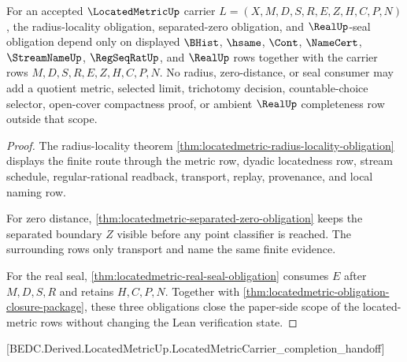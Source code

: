 \begin{theorem}\label{thm:locatedmetric-scoped-obligation-rows}
For an accepted $\LocatedMetricUp$ carrier $L=(X,M,D,S,R,E,Z,H,C,P,N)$, the radius-locality obligation, separated-zero obligation, and $\RealUp$-seal obligation depend only on displayed $\BHist$, $\hsame$, $\Cont$, $\NameCert$, $\StreamNameUp$, $\RegSeqRatUp$, and $\RealUp$ rows together with the carrier rows $M,D,S,R,E,Z,H,C,P,N$. No radius, zero-distance, or seal consumer may add a quotient metric, selected limit, trichotomy decision, countable-choice selector, open-cover compactness proof, or ambient $\RealUp$ completeness row outside that scope.
\end{theorem}
\begin{proof}
The radius-locality theorem \autoref{thm:locatedmetric-radius-locality-obligation} displays the finite route through the metric row, dyadic locatedness row, stream schedule, regular-rational readback, transport, replay, provenance, and local naming row.

For zero distance, \autoref{thm:locatedmetric-separated-zero-obligation} keeps the separated boundary $Z$ visible before any point classifier is reached. The surrounding rows only transport and name the same finite evidence.

For the real seal, \autoref{thm:locatedmetric-real-seal-obligation} consumes $E$ after $M,D,S,R$ and retains $H,C,P,N$. Together with \autoref{thm:locatedmetric-obligation-closure-package}, these three obligations close the paper-side scope of the located-metric rows without changing the Lean verification state.
\end{proof}

[BEDC.Derived.LocatedMetricUp.LocatedMetricCarrier\_completion\_handoff]

